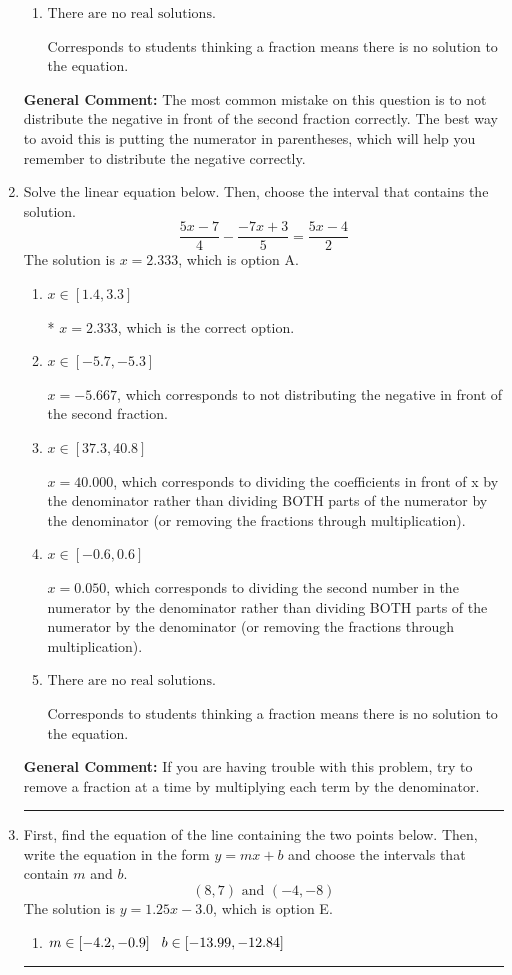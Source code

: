 \documentclass{extbook}[14pt]
\newcommand{\litem}[1]{\item #1

\rule{\textwidth}{0.4pt}}
\begin{document}
\begin{enumerate}
{\begin{enumerate}[label=\Alph*.]
$x = 1.069$, which corresponds to not distributing the negative in front of the first parentheses correctly.
\item \( \text{There are no real solutions.} \)

Corresponds to students thinking a fraction means there is no solution to the equation.
\end{enumerate}

\textbf{General Comment:} The most common mistake on this question is to not distribute the negative in front of the second fraction correctly. The best way to avoid this is putting the numerator in parentheses, which will help you remember to distribute the negative correctly.
}
\litem{
Solve the linear equation below. Then, choose the interval that contains the solution.
\[ \frac{5x -7}{4} - \frac{-7x + 3}{5} = \frac{5x -4}{2} \]The solution is \( x = 2.333 \), which is option A.\begin{enumerate}[label=\Alph*.]
\item \( x \in [1.4, 3.3] \)

* $x = 2.333$, which is the correct option.
\item \( x \in [-5.7, -5.3] \)

 $x = -5.667$, which corresponds to not distributing the negative in front of the second fraction.
\item \( x \in [37.3, 40.8] \)

 $x = 40.000$, which corresponds to dividing the coefficients in front of x by the denominator rather than dividing BOTH parts of the numerator by the denominator (or removing the fractions through multiplication).
\item \( x \in [-0.6, 0.6] \)

 $x = 0.050$, which corresponds to dividing the second number in the numerator by the denominator rather than dividing BOTH parts of the numerator by the denominator (or removing the fractions through multiplication).
\item \( \text{There are no real solutions.} \)

Corresponds to students thinking a fraction means there is no solution to the equation.
\end{enumerate}

\textbf{General Comment:} If you are having trouble with this problem, try to remove a fraction at a time by multiplying each term by the denominator.
}
\litem{
First, find the equation of the line containing the two points below. Then, write the equation in the form $ y=mx+b $ and choose the intervals that contain $m$ and $b$.
\[ (8, 7) \text{ and } (-4, -8) \]The solution is \( y = 1.25x -3.0 \), which is option E.\begin{enumerate}[label=\Alph*.]
\item \( m \in [-4.2, -0.9] \hspace*{3mm} b \in [-13.99, -12.84] \)


\end{enumerate}}
\end{enumerate}
\end{document}
